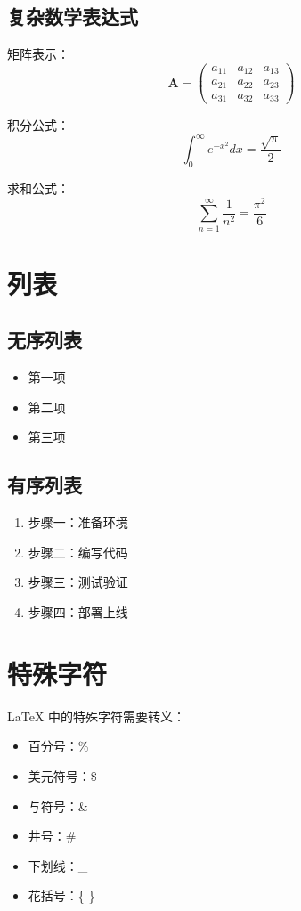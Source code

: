 \documentclass{article}
\begin{document}
\subsection{复杂数学表达式}

矩阵表示：
$$
\mathbf{A} = \begin{pmatrix}
a_{11} & a_{12} & a_{13} \\
a_{21} & a_{22} & a_{23} \\
a_{31} & a_{32} & a_{33}
\end{pmatrix}
$$

积分公式：
$$\int_{0}^{\infty} e^{-x^2} dx = \frac{\sqrt{\pi}}{2}$$

求和公式：
$$\sum_{n=1}^{\infty} \frac{1}{n^2} = \frac{\pi^2}{6}$$

\section{列表}

\subsection{无序列表}

\begin{itemize}
    \item 第一项
    \item 第二项
    \item 第三项
\end{itemize}

\subsection{有序列表}

\begin{enumerate}
    \item 步骤一：准备环境
    \item 步骤二：编写代码
    \item 步骤三：测试验证
    \item 步骤四：部署上线
\end{enumerate}

\section{特殊字符}

LaTeX 中的特殊字符需要转义：

\begin{itemize}
    \item 百分号：\%
    \item 美元符号：\$
    \item 与符号：\&
    \item 井号：\#
    \item 下划线：\_
    \item 花括号：\{ \}
\end{itemize}
\end{document}
